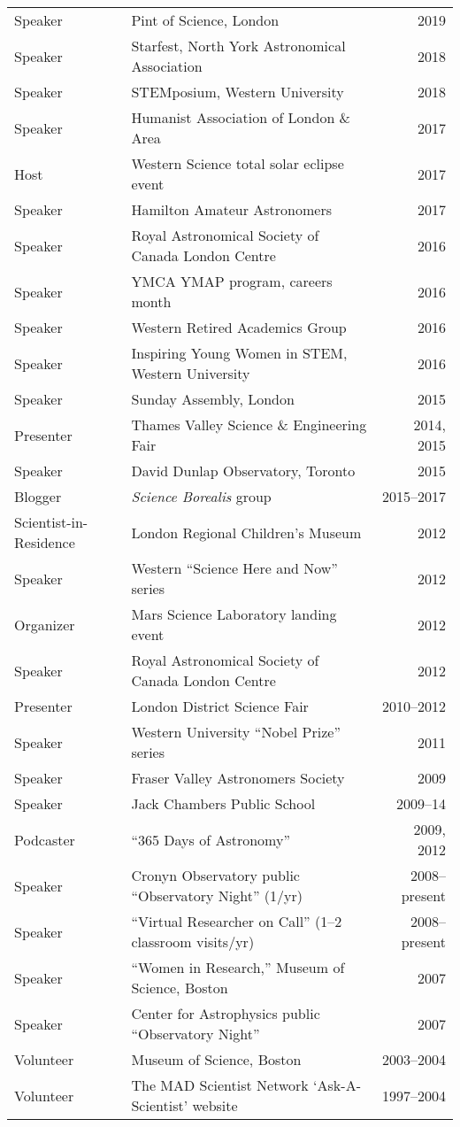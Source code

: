 \begin{tabularx}{\textwidth}{lXr}
Speaker &  Pint of Science, London& 2019\\
Speaker &  Starfest, North York Astronomical Association& 2018\\
Speaker &  STEMposium, Western University& 2018\\
Speaker & Humanist Association of London \& Area & 2017\\
Host & Western Science total solar eclipse event & 2017\\
Speaker & Hamilton Amateur Astronomers & 2017\\
Speaker& Royal Astronomical Society of Canada London Centre& 2016\\
Speaker & YMCA YMAP program, careers month & 2016\\
Speaker& Western Retired Academics Group& 2016\\
Speaker &  Inspiring Young Women in STEM, Western University & 2016\\
Speaker & Sunday Assembly, London  & 2015\\
Presenter& Thames Valley Science \& Engineering Fair& 2014, 2015\\
Speaker & David Dunlap Observatory, Toronto& 2015\\
Blogger & {\it Science Borealis} group& 2015--2017\\
Scientist-in-Residence& London Regional Children's Museum& 2012\\
Speaker& Western ``Science Here and Now'' series& 2012\\
Organizer& Mars Science Laboratory landing event& 2012\\
Speaker& Royal Astronomical Society of Canada London Centre& 2012\\
Presenter& London District Science Fair& 2010--2012\\
Speaker& Western University ``Nobel Prize'' series& 2011\\
Speaker& Fraser Valley Astronomers Society& 2009\\
Speaker& Jack Chambers Public School& 2009--14\\
Podcaster &  ``365 Days of Astronomy''  &2009, 2012\\
Speaker& Cronyn Observatory public ``Observatory Night'' (1/yr)& 2008--present\\
Speaker& ``Virtual Researcher on Call''  (1--2 classroom visits/yr) & 2008--present\\
Speaker & ``Women in Research,''  Museum of Science, Boston& 2007\\
Speaker& Center for Astrophysics public ``Observatory Night'' & 2007\\
Volunteer& Museum of Science, Boston& 2003--2004\\
Volunteer& The MAD Scientist Network `Ask-A-Scientist' website& 1997--2004\\
\end{tabularx}
